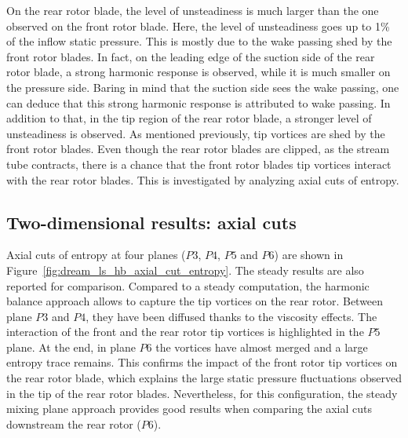 On the rear rotor blade, the level
of unsteadiness is much larger than the one observed on
the front rotor blade. 
Here, the level of unsteadiness
goes up to 1\% of the inflow static pressure.
This is mostly due to the wake passing
shed by the front rotor blades. In fact, on the leading
edge of the suction side of the rear rotor blade, 
a strong harmonic response is observed, while it is 
much smaller on the pressure side. Baring in mind that 
the suction side sees the wake passing, one can deduce
that this strong harmonic response is attributed to wake passing.
In addition to that, in the tip region of the rear rotor blade, 
a stronger level of unsteadiness is observed. As mentioned
previously, tip vortices are shed by the front rotor blades.
Even though the rear rotor blades are clipped, as 
the stream tube contracts, there is a chance that
the front rotor blades tip vortices interact with the 
rear rotor blades. This is investigated by analyzing
axial cuts of entropy.

\subsection{Two-dimensional results: axial cuts}
\label{sub:dream_ls_hb_axial_cuts}

Axial cuts of entropy at four planes ($P3$, $P4$, $P5$ and $P6$)
are shown in Figure~\ref{fig:dream_ls_hb_axial_cut_entropy}.
The steady results are also reported for comparison.
Compared to a steady computation, the harmonic balance
approach allows to capture the
tip vortices on the rear rotor. Between plane $P3$
and $P4$, they have been diffused thanks to the viscosity effects.
The interaction of the front and the rear rotor tip vortices
is highlighted in the $P5$ plane. At the end, in plane $P6$
the vortices have almost merged and a large entropy
trace remains. This confirms the impact
of the front rotor tip vortices on the
rear rotor blade, which explains the large static pressure
fluctuations observed in the tip of the rear 
rotor blades. Nevertheless, for this
configuration, the steady mixing plane approach 
provides good results when comparing the axial
cuts downstream the rear rotor ($P6$).

